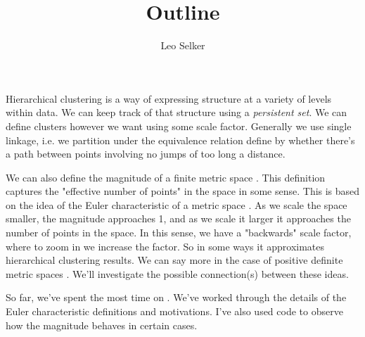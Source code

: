 \documentclass[]{article}
\title{Outline}
\author{Leo Selker}
\begin{document}
\maketitle
Hierarchical clustering is a way of expressing structure at a variety of levels within data. We can keep track of that structure using a \textit{persistent set}\cite{Carl1}. We can define clusters however we want using some scale factor. Generally we use single linkage, i.e. we partition under the equivalence relation define by whether there's a path between points involving no jumps of too long a distance.

We can also define the magnitude of a finite metric space \cite{Lein2}. This definition captures the "effective number of points" in the space in some sense. This is based on the idea of the Euler characteristic of a metric space \cite{Lein1}. As we scale the space smaller, the magnitude approaches 1, and as we scale it larger it approaches the number of points in the space. In this sense, we have a "backwards" scale factor, where to zoom in we increase the factor. So in some ways it approximates hierarchical clustering results. We can say more in the case of positive definite metric spaces \cite{Meck1}. We'll investigate the possible connection(s) between these ideas.

So far, we've spent the most time on \cite{Lein1}. We've worked through the details of the Euler characteristic definitions and motivations. I've also used code to observe how the magnitude behaves in certain cases.





{}

\end{document}
